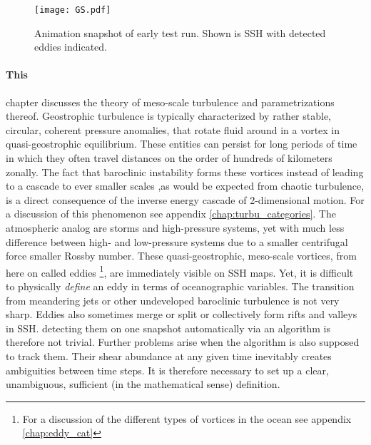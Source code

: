 \label{chap:intro}


\begin{wrapfigure}[20]{r}{0.5\textwidth}
\vspace{-5mm}
\begin{center}
  \texttt{[image: GS.pdf]}
\caption{Animation snapshot of early test run. Shown is SSH with detected eddies indicated.}
\end{center}
\vspace{-15mm}
\end{wrapfigure}


\paragraph{This}chapter discusses the theory of meso-scale turbulence and parametrizations thereof.
Geostrophic turbulence is typically characterized by rather stable, circular, coherent pressure anomalies, that rotate fluid around in a vortex in
quasi-geostrophic equilibrium. These entities can persist for long periods of time in which they often travel distances on the order of hundreds of kilometers
zonally. The fact that baroclinic instability forms these vortices instead of leading to a cascade to ever smaller scales ,as would be expected from chaotic
turbulence, is a direct consequence of the inverse energy cascade of 2-dimensional motion. For a discussion of this phenomenon see appendix
\ref{chap:turbu_categories}. The atmospheric analog are storms and high-pressure systems, yet with much less difference between high- and low-pressure systems due to
a smaller centrifugal force \ie smaller Rossby number. These quasi-geostrophic, meso-scale vortices, from here on called eddies \footnote{For a discussion of
the different types of vortices in the ocean see appendix \ref{chap:eddy_cat}}, are immediately visible on
SSH maps. Yet, it is difficult to physically \emph{define} an eddy in terms of oceanographic variables. The transition from meandering jets or other undeveloped
baroclinic turbulence is not very sharp. Eddies also sometimes merge or split or collectively form rifts and valleys in SSH. detecting them on one snapshot
automatically via an algorithm is therefore not trivial. Further problems arise when the algorithm is also supposed to track them. Their shear abundance at any
given time inevitably creates ambiguities between time steps. It is therefore necessary to set up a clear, unambiguous, sufficient (in the mathematical sense)
definition.\\


